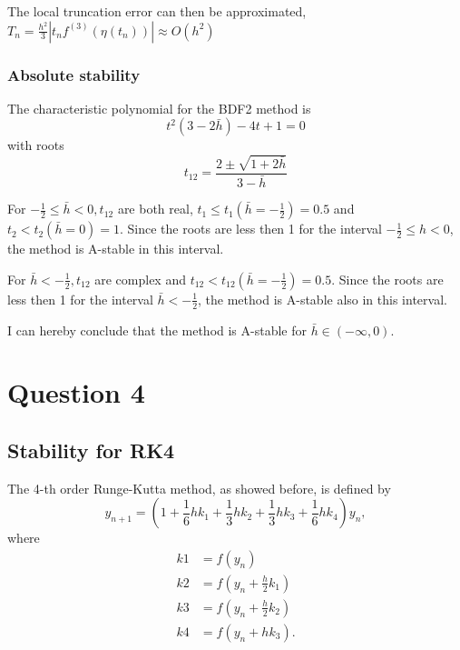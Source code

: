 \documentclass[a4paper, 11pt]{article}
\begin{document}
				The local truncation error can then be approximated, $T_n = \frac{h^2}{3}\left|t_nf^{(3)}(\eta(t_n))\right| \approx O(h^2) $
			
			\subsubsection*{Absolute stability}
			
				The characteristic polynomial for the BDF2 method is
				\begin{equation}
					t^2 (3 - 2 \bar{h}) - 4t + 1 = 0
				\end{equation}
				with roots
				\begin{equation}
					t_{12} =  \frac{2 \pm \sqrt{1+2\bar{h}}}{3-\bar{h}}
				\end{equation}
				
				For $-\frac{1}{2} \le \bar{h} < 0, t_{12}$ are both real, $t_{1} \le t_1(\bar{h}=-\frac{1}{2})= 0.5$ and $t_{2} < t_2(\bar{h}=0)= 1$.
				Since the roots are less then 1 for the interval $-\frac{1}{2} \le h < 0$, the method is A-stable in this interval.
				
				For $\bar{h} <-\frac{1}{2},  t_{12}$ are complex and $t_{12} < t_{12}(\bar{h}=-\frac{1}{2})= 0.5$.
				Since the roots are less then 1 for the interval $\bar{h} <-\frac{1}{2}$, the method is A-stable also in this interval.
				
				I can hereby conclude that the method is A-stable for $\bar{h} \in (-\infty,0)$.
						
		\section*{Question 4}
			\subsection*{Stability for RK4}
			
				The 4-th order Runge-Kutta method, as showed before, is defined by
				\begin{equation}
					y_{n+1} = \left(1 + \frac{1}{6}hk_1 + \frac{1}{3}hk_2 + \frac{1}{3}hk_3 + \frac{1}{6}hk_4\right)y_n,
				\end{equation}
				where
				\begin{align}
						k1 &= f(y_{n}) \\
						k2 &= f(y_{n} + \frac{h}{2} k_1) \\
						k3 &= f(y_{n} + \frac{h}{2} k_2) \\
						k4 &= f(y_{n} + h k_3).
				\end{align}
			
\end{document}
